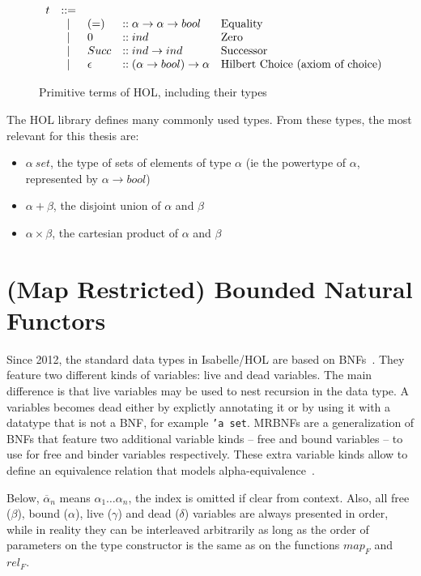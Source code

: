 \begin{figure} %
\[
\begin{array}{rclll}
t  & \mathop{{:}{:}{=}} & & & \\
& \mathop{|} & (=) & :: \alpha \to \alpha \to bool & \text{Equality} \\
& \mathop{|} & 0 & :: ind & \text{Zero} \\
& \mathop{|} & Succ & :: ind \to ind & \text{Successor} \\
& \mathop{|} & \epsilon & :: (\alpha \to bool) \to \alpha & \text{Hilbert Choice (axiom of choice)} \\
\end{array}
\]
\caption{Primitive terms of \ac{HOL}, including their types}
\label{fig:hol_terms}
\end{figure}

The \ac{HOL} library defines many commonly used types. From these types, the most relevant for this thesis are:

\begin{itemize}
\item{$\alpha \: set$, the type of sets of elements of type $\alpha$ (ie the powertype of $\alpha$, represented by $\alpha \to bool$)}
\item{$\alpha + \beta$, the disjoint union of $\alpha$ and $\beta$}
\item{$\alpha \times \beta$, the cartesian product of $\alpha$ and $\beta$}
\end{itemize}

\section{(Map Restricted) Bounded Natural Functors}\label{sec:mrbnf_theory}

Since 2012, the standard data types in Isabelle/HOL are based on \acfp{BNF}~\cite{isabelle_datatypes}. They feature two different kinds of variables: live and dead variables. The main difference is that live variables may be used to nest recursion in the data type. A variables becomes dead either by explictly annotating it or by using it with a datatype that is not a \ac{BNF}, for example \texttt{'a set}. \acp{MRBNF} are a generalization of \acp{BNF} that feature two additional variable kinds -- free and bound variables -- to use for free and binder variables respectively. These extra variable kinds allow to define an equivalence relation that models alpha-equivalence~\cite{mrbnfs}.

Below, $\overline{\alpha}_n$ means $\alpha_1 \dots \alpha_n$, the index is omitted if clear from context. Also, all free ($\beta$), bound ($\alpha$), live ($\gamma$) and dead ($\delta$) variables are always presented in order, while in reality they can be interleaved arbitrarily as long as the order of parameters on the type constructor is the same as on the functions $map_F$ and $rel_F$.

